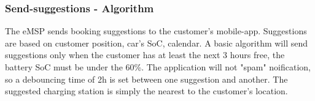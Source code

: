 \subsubsection{Send-suggestions - Algorithm}
The eMSP sends booking suggestions to the customer's mobile-app. Suggestions are based on customer position, car's SoC, calendar. A basic algorithm will send suggestions only when the customer has at least the next 3 hours free, the battery SoC must be under the 60\%. The application will not "spam" noification, so a debouncing time of 2h is set between one suggestion and another. The suggested charging station is simply the nearest to the customer's location.